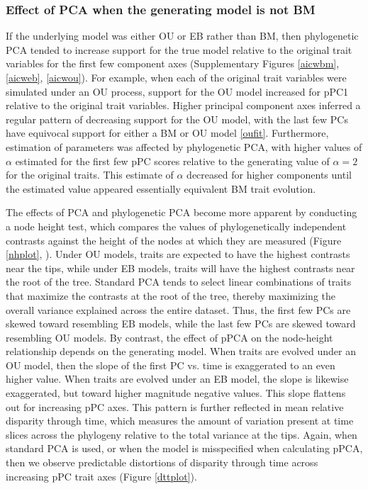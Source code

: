 \documentclass[a4paper,12pt]{article}
\begin{document}
\subsubsection{Effect of PCA when the generating model is not BM}
If the underlying model was either OU or EB rather than BM, then phylogenetic PCA tended to increase support for the true model relative to the original trait variables for the first few component axes (Supplementary Figures \ref{aicwbm}, \ref{aicweb}, \ref{aicwou}). For example, when each of the original trait variables were simulated under an OU process, support for the OU model increased for pPC1 relative to the original trait variables. Higher principal component axes inferred a regular pattern of decreasing support for the OU model, with the last few PCs have equivocal support for either a BM or OU model \ref{oufit}. Furthermore, estimation of parameters was affected by phylogenetic PCA, with higher values of $\alpha$ estimated for the first few pPC scores relative to the generating value of $\alpha=2$ for the original traits. This estimate of $\alpha$ decreased for higher components until the estimated value appeared essentially equivalent BM trait evolution. 

The effects of PCA and phylogenetic PCA become more apparent by conducting a node height test, which compares the values of phylogenetically independent contrasts against the height of the nodes at which they are measured (Figure \ref{nhplot}, \citealt{Freckleton2006}). Under OU models, traits are expected to have the highest contrasts near the tips, while under EB models, traits will have the highest contrasts near the root of the tree. Standard PCA tends to select linear combinations of traits that maximize the contrasts at the root of the tree, thereby maximizing the overall variance explained across the entire dataset. Thus, the first few PCs are skewed toward resembling EB models, while the last few PCs are skewed toward resembling OU models. By contrast, the effect of pPCA on the node-height relationship depends on the generating model. When traits are evolved under an OU model, then the slope of the first PC vs. time is exaggerated to an even higher value. When traits are evolved under an EB model, the slope is likewise exaggerated, but toward higher magnitude negative values. This slope flattens out for increasing pPC axes. This pattern is further reflected in mean relative disparity through time, which measures the amount of variation present at time slices across the phylogeny relative to the total variance at the tips. Again, when standard PCA is used, or when the model is misspecified when calculating pPCA, then we observe predictable distortions of disparity through time across increasing pPC trait axes (Figure \ref{dttplot}). 
\end{document}
